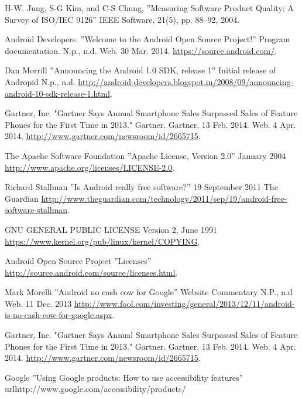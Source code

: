 \documentclass[conference]{IEEEtran}
\begin{document}
\begin{thebibliography}{1}

H-W. Jung, S-G Kim, and C-S Chung, ''Measuring Software Product Quality: A Survey of ISO/IEC 9126'' IEEE Software, 21(5), pp. 88--92, 2004.


Android Developers. ''Welcome to the Android Open Source Project!'' Program documentation. N.p., n.d. Web. 30 Mar. 2014. \url{https://source.android.com/}.

Dan Morrill ''Announcing the Android 1.0 SDK, release 1'' Initial release of Andropid N.p., n.d. \url{http://android-developers.blogspot.in/2008/09/announcing-android-10-sdk-release-1.html}.

Gartner, Inc. "Gartner Says Annual Smartphone Sales Surpassed Sales of Feature Phones for the First Time in 2013." Gartner. Gartner, 13 Feb. 2014. Web. 4 Apr. 2014. \url{http://www.gartner.com/newsroom/id/2665715}.

The Apache Software Foundation ''Apache License, Version 2.0'' January 2004 \url{http://www.apache.org/licenses/LICENSE-2.0}.

Richard Stallman ''Is Android really free software?'' 19 September 2011 The Guardian \url{http://www.theguardian.com/technology/2011/sep/19/android-free-software-stallman}.

GNU GENERAL PUBLIC LICENSE Version 2, June 1991 \url{https://www.kernel.org/pub/linux/kernel/COPYING}.

Android Open Source Project ''Licenses'' \url{http://source.android.com/source/licenses.html}.

Mark Morelli ''Android no cash cow for Google'' Website Commentary N.P., n.d Web. 11 Dec. 2013 \url{http://www.fool.com/investing/general/2013/12/11/android-is-no-cash-cow-for-google.aspx}.

Gartner, Inc. "Gartner Says Annual Smartphone Sales Surpassed Sales of Feature Phones for the First Time in 2013." Gartner. Gartner, 13 Feb. 2014. Web. 4 Apr. 2014. \url{http://www.gartner.com/newsroom/id/2665715}.

Google ''Using Google products: How to use accessibility features'' url{http://www.google.com/accessibility/products/}


\end{thebibliography}
\end{document}
